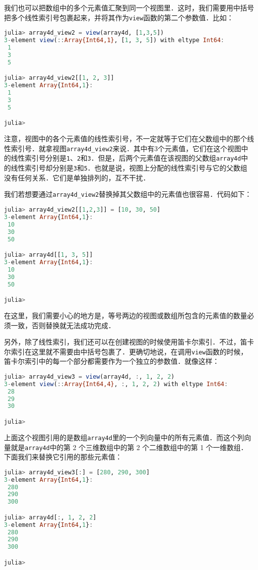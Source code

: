 我们也可以把数组中的多个元素值汇聚到同一个视图里．这时，我们需要用中括号把多个线性索引号包裹起来，并将其作为\verb|view|函数的第二个参数值．比如：

\begin{lstlisting}[language=julia]
julia> array4d_view2 = view(array4d, [1,3,5])
3-element view(::Array{Int64,1}, [1, 3, 5]) with eltype Int64:
 1
 3
 5

julia> array4d_view2[[1, 2, 3]]
3-element Array{Int64,1}:
 1
 3
 5

julia> 
\end{lstlisting}

注意，视图中的各个元素值的线性索引号，不一定就等于它们在父数组中的那个线性索引号．就拿视图\verb|array4d_view2|来说．其中有3个元素值，它们在这个视图中的线性索引号分别是\verb|1|、\verb|2|和\verb|3|．但是，后两个元素值在该视图的父数组\verb|array4d|中的线性索引号却分别是\verb|3|和\verb|5|．也就是说，视图上分配的线性索引号与它的父数组没有任何关系．它们是单独排列的，互不干扰．

我们若想要通过\verb|array4d_view2|替换掉其父数组中的元素值也很容易．代码如下：

\begin{lstlisting}[language=julia]
julia> array4d_view2[[1,2,3]] = [10, 30, 50]
3-element Array{Int64,1}:
 10
 30
 50

julia> array4d[[1, 3, 5]]
3-element Array{Int64,1}:
 10
 30
 50

julia> 
\end{lstlisting}

在这里，我们需要小心的地方是，等号两边的视图或数组所包含的元素值的数量必须一致，否则替换就无法成功完成．

另外，除了线性索引，我们还可以在创建视图的时候使用笛卡尔索引．不过，笛卡尔索引在这里就不需要由中括号包裹了．更确切地说，在调用\verb|view|函数的时候，笛卡尔索引中的每一个部分都需要作为一个独立的参数值．就像这样：

\begin{lstlisting}[language=julia]
julia> array4d_view3 = view(array4d, :, 1, 2, 2)
3-element view(::Array{Int64,4}, :, 1, 2, 2) with eltype Int64:
 28
 29
 30

julia>  
\end{lstlisting}

上面这个视图引用的是数组\verb|array4d|里的一个列向量中的所有元素值．而这个列向量就是\verb|array4d|中的第 2 个三维数组中的第 2 个二维数组中的第 1 个一维数组．下面我们来替换它引用的那些元素值：

\begin{lstlisting}[language=julia]
julia> array4d_view3[:] = [280, 290, 300]
3-element Array{Int64,1}:
 280
 290
 300

julia> array4d[:, 1, 2, 2]
3-element Array{Int64,1}:
 280
 290
 300

julia> 
\end{lstlisting}

